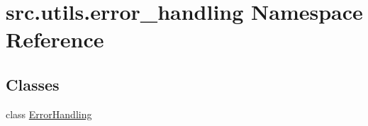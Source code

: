 \hypertarget{namespacesrc_1_1utils_1_1error__handling}{\section{src.\+utils.\+error\+\_\+handling Namespace Reference}
\label{namespacesrc_1_1utils_1_1error__handling}
}
\subsection*{Classes}
\begin{DoxyCompactItemize}
\item 
class \hyperlink{classsrc_1_1utils_1_1error__handling_1_1_error_handling}{Error\+Handling}
\end{DoxyCompactItemize}
